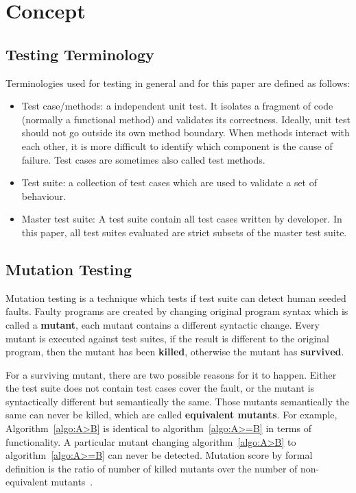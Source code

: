 \section{Concept}
\subsection{Testing Terminology}
Terminologies used for testing in general and for this paper are defined as follows:
\begin{itemize}
	\item Test case/methods: a independent unit test. It isolates a fragment of code (normally a functional method) and validates its correctness. Ideally, unit test should not go outside its own method boundary. When methods interact with each other, it is more difficult to identify which component is the cause of failure. Test cases are sometimes also called test methods.
	\item Test suite: a collection of test cases which are used to validate a set of behaviour.
	\item Master test suite: A test suite contain all test cases written by developer. In this paper, all test suites evaluated are strict subsets of the master test suite.
\end{itemize}
\subsection{Mutation Testing}
Mutation testing is a technique which tests if test suite can detect human seeded faults. Faulty programs are created by changing original program syntax which is called a \textbf{mutant}, each mutant contains a different syntactic change. Every mutant is executed against test suites, if the result is different to the original program, then the mutant has been \textbf{killed}, otherwise the mutant has \textbf{survived}.

For a surviving mutant, there are two possible reasons for it to happen. Either the test suite does not contain test cases cover the fault, or the mutant is syntactically different but semantically the same. Those mutants semantically the same can never be killed, which are called \textbf{equivalent mutants}. For example, Algorithm~\ref{algo:A>B} is identical to algorithm~\ref{algo:A>=B} in terms of functionality. A particular mutant changing algorithm~\ref{algo:A>B} to algorithm~\ref{algo:A>=B} can never be detected. Mutation score by formal definition is the ratio of number of killed mutants over the number of non-equivalent mutants~\cite{jia2011analysis}. 

